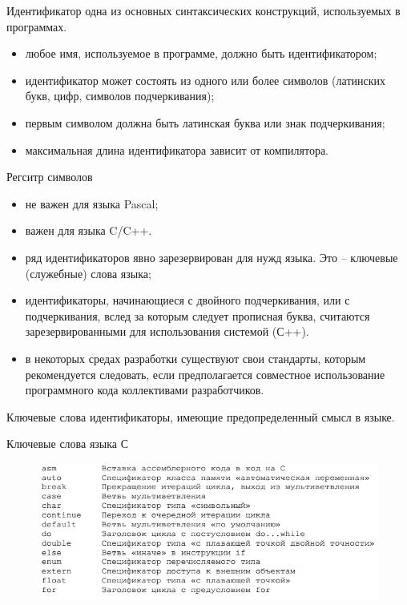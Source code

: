 \documentclass{beamer}
\begin{document}
\begin{frame}
\begin{block}{Идентификатор}
одна из основных синтаксических конструкций, используемых в программах. 
\end{block}
\begin{itemize}
\item любое имя, используемое в программе, должно быть идентификатором;
\item идентификатор может состоять из одного или более символов (латинских букв, цифр, символов подчеркивания);
\item первым символом должна быть латинская буква или знак подчеркивания;
\item максимальная длина идентификатора зависит от компилятора.
\end{itemize}
\begin{block}{Регситр символов}
\begin{itemize}
\item не важен для языка Pascal;
\item важен для языка C/C++.
\end{itemize}
\end{block}
\end{frame}

\begin{frame}
\begin{itemize}
\item ряд идентификаторов явно зарезервирован для нужд языка. Это –
ключевые (служебные) слова языка;
\item идентификаторы, начинающиеся с двойного подчеркивания, или с подчеркивания, вслед за которым следует прописная буква, считаются зарезервированными для использования системой (С++). 
\item в некоторых средах разработки существуют свои стандарты,
которым рекомендуется следовать, если предполагается совместное
использование программного кода коллективами разработчиков.
\end{itemize}
\end{frame}

\begin{frame}
\begin{block}{Ключевые слова}
идентификаторы, имеющие предопределенный смысл в языке.
\end{block}
Ключевые слова языка С
\begin{figure}[h]
\centering
\includegraphics[scale=0.6]{images/lec01-pic16.png}
\end{figure}
\end{frame}
\end{document}
